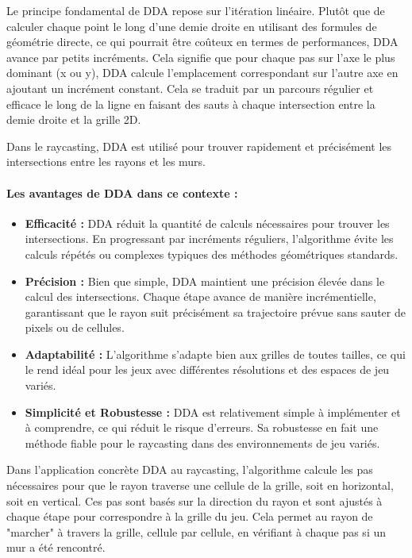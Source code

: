\documentclass[12pt]{report}
\begin{document}
Le principe fondamental de DDA repose sur l'itération linéaire. Plutôt que de calculer chaque point le long d'une demie droite en utilisant des formules de géométrie 
directe, ce qui pourrait être coûteux en termes de performances, DDA avance par petits incréments. Cela signifie que pour chaque pas sur l'axe le plus 
dominant (x ou y), DDA calcule l'emplacement correspondant sur l'autre axe en ajoutant un incrément constant. Cela se traduit par un parcours régulier et 
efficace le long de la ligne en faisant des sauts à chaque intersection entre la demie droite et la grille 2D.

Dans le raycasting, DDA est utilisé pour trouver rapidement et précisément les intersections entre les rayons et les murs. 

\paragraph{Les avantages de DDA dans ce contexte :}
\begin{itemize}
\item \textbf{Efficacité :} DDA réduit la quantité de calculs nécessaires pour trouver les intersections. En progressant par 
incréments réguliers, l'algorithme évite les calculs répétés ou complexes typiques des méthodes géométriques standards.
\item \textbf{Précision :} Bien que simple, DDA maintient une précision élevée dans le calcul des intersections. Chaque étape 
avance de manière incrémentielle, garantissant que le rayon suit précisément sa trajectoire prévue sans sauter de pixels ou de cellules.
\item \textbf{Adaptabilité :} L'algorithme s'adapte bien aux grilles de toutes tailles, ce qui le rend idéal pour les jeux avec 
différentes résolutions et des espaces de jeu variés.
\item \textbf{Simplicité et Robustesse :} DDA est relativement simple à implémenter et à comprendre, ce qui réduit le risque 
d'erreurs. Sa robustesse en fait une méthode fiable pour le raycasting dans des environnements de jeu variés.
\end{itemize}

Dans l'application concrète DDA au raycasting, l'algorithme calcule les pas nécessaires pour que le rayon 
traverse une cellule de la grille, soit en horizontal, soit en vertical. Ces pas sont basés sur la direction du 
rayon et sont ajustés à chaque étape pour correspondre à la grille du jeu. Cela permet au rayon de "marcher" à travers 
la grille, cellule par cellule, en vérifiant à chaque pas si un mur a été rencontré.
\end{document}
